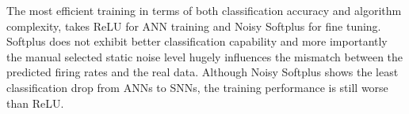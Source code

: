 \documentclass{article}
\begin{document}




The most efficient training in terms of both classification accuracy and algorithm complexity, takes ReLU for ANN training and Noisy Softplus for fine tuning.
Softplus does not exhibit better classification capability and more importantly the manual selected static noise level hugely influences the mismatch between the predicted firing rates and the real data.
Although Noisy Softplus shows the least classification drop from ANNs to SNNs, the training performance is still worse than ReLU.
\end{document}
